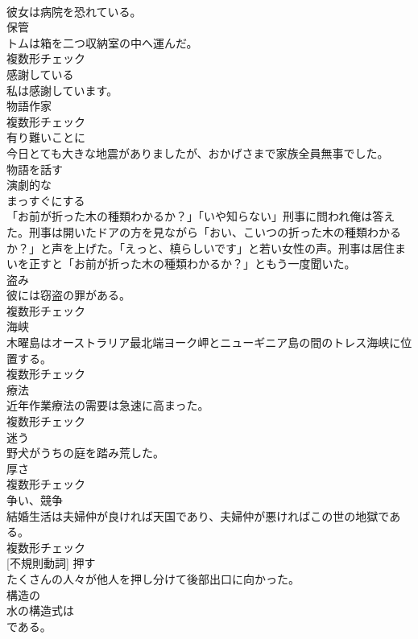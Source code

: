 \documentclass[8pt]{extreport}
\begin{document}
\begin{CJK}{UTF8}{min}
\\	彼女は病院を恐れている。	
\\	[名詞]	保管	
\\	トムは箱を二つ収納室の中へ運んだ。	
\\	複数形チェック
\\	[形容詞]	感謝している	
\\	私は感謝しています。	
\\	[名詞]	物語作家	
\\	複数形チェック
\\	[副詞]	有り難いことに	
\\	今日とても大きな地震がありましたが、おかげさまで家族全員無事でした。	
\\	[形容詞]	物語を話す	
\\	[形容詞]	演劇的な	
\\	[動詞]	まっすぐにする	
\\	「お前が折った木の種類わかるか？」「いや知らない」刑事に問われ俺は答えた。刑事は開いたドアの方を見ながら「おい、こいつの折った木の種類わかるか？」と声を上げた。「えっと、槙らしいです」と若い女性の声。刑事は居住まいを正すと「お前が折った木の種類わかるか？」ともう一度聞いた。	
\\	[名詞]	盗み	
\\	彼には窃盗の罪がある。	
\\	複数形チェック
\\	[名詞]	海峡	
\\	木曜島はオーストラリア最北端ヨーク岬とニューギニア島の間のトレス海峡に位置する。	
\\	複数形チェック
\\	[名詞]	療法	
\\	近年作業療法の需要は急速に高まった。	
\\	複数形チェック
\\	[動詞]	迷う	
\\	野犬がうちの庭を踏み荒した。	
\\	[名詞]	厚さ	
\\	複数形チェック
\\	[名詞]	争い、競争	
\\	結婚生活は夫婦仲が良ければ天国であり、夫婦仲が悪ければこの世の地獄である。	
\\	複数形チェック
\\	[動詞] [不規則動詞]	押す	
\\	たくさんの人々が他人を押し分けて後部出口に向かった。	
\\	[形容詞]	構造の	
\\	水の構造式は 
\\	である。	

\end{CJK}
\end{document}
